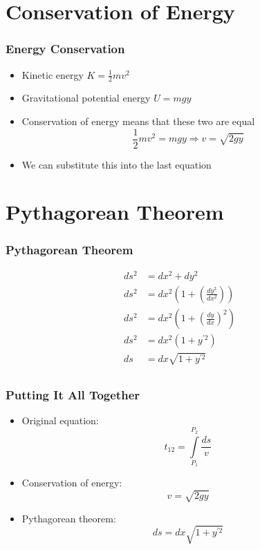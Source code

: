 \documentclass[12pt]{beamer}
\begin{document}
\section{Conservation of Energy}
\begin{frame}
\frametitle{Energy Conservation}
\begin{itemize}
    \pause
    \item Kinetic energy $K = \frac{1}{2} mv^2$
    \pause
    \item Gravitational potential energy $U = mgy$
    \pause
    \item Conservation of energy means that these two are equal
    \pause
    $$
    \frac{1}{2} mv^2 = mgy \Rightarrow v = \sqrt{2gy}
    $$
    \pause
    \item We can substitute this into the last equation
\end{itemize}
\end{frame}

\section{Pythagorean Theorem}
\begin{frame}
\frametitle{Pythagorean Theorem}
\begin{align*}
    ds^2 &= dx^2 + dy^2 \\
    ds^2 &= dx^2 \left ( 1 + \left ( \frac{dy^2}{dx^2} \right) \right) \\
    ds^2 &= dx^2 \left ( 1 + \left ( \frac{dy}{dx} \right)^2 \right) \\
    ds^2 &= dx^2 \left ( 1 + y^{'2} \right ) \\
    ds &= dx \sqrt{1 + y^{'2}} \\
\end{align*}
\end{frame}

\begin{frame}
\frametitle{Putting It All Together}
\begin{itemize}
    \item Original equation:
    $$
    t_{12} = \int \limits_{P_1}^{P_2} \frac{ds}{v}
    $$
    \pause
    \item Conservation of energy:
    $$
    v = \sqrt{2gy}
    $$
    \pause
    \item Pythagorean theorem:
    $$
    ds = dx \sqrt{1 + y^{'2}}
    $$
\end{itemize}
\end{frame}
\end{document}
